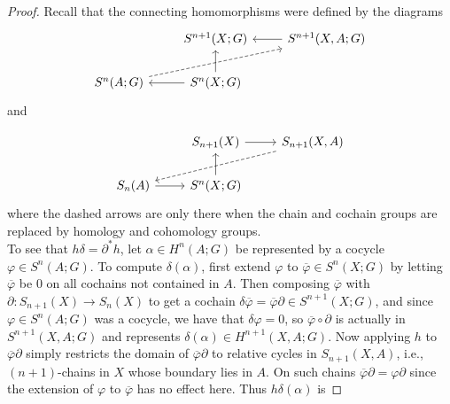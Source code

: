 \documentclass[reqno]{amsart}
\theoremstyle{definition}
\theoremstyle{remark}
\begin{document}
     \begin{proof}
         Recall that the connecting homomorphisms
         were defined by the diagrams
         \begin{equation*}
         \begin{tikzcd}
             & S^{n+1}(X;G) & S^{n+1}(X,A;G) \ar[l] \\
             S^{n}(A;G) \ar[rru, dashed] & S^{n}(X;G) \ar[u] 
             \ar[l]
         \end{tikzcd}
         \end{equation*}
         and

         \begin{equation*}
         \begin{tikzcd}
             & S_{n+1}(X) \ar[r] & S_{n+1}(X,A) \ar[dll, dashed]\\
             S_n(A) \ar[r] & S^{n}(X;G) \ar[u] &
         \end{tikzcd}
         \end{equation*}
         where the dashed arrows are
         only there when the chain and cochain groups
         are replaced by homology and cohomology groups.\\
         To see that $h \delta = \partial^{*} h$,
         let $\alpha \in H^{n}(A;G)$ be represented
         by a cocycle $\varphi  \in S^{n}(A;G)$.
         To compute $\delta (\alpha)$, first
         extend $\varphi $ to
         $\overline{\varphi }\in 
         S^{n}(X;G)$ by letting $\overline{\varphi }$ 
         be $0$ on all cochains not contained in
         $A$. Then
         composing $\overline{\varphi }$ with
         $\partial \colon S_{n+1}(X) \to S_n(X)$
         to get a cochain
         $\delta \overline{\varphi }
         = \overline{\varphi } \partial \in 
         S^{n+1}(X;G)$, and since
         $\varphi \in S^{n}(A;G)$ was a cocycle, we have
         that $\delta \varphi  = 0$, so
         $\overline{\varphi } \circ \partial$ is actually
         in $S^{n+1}(X,A;G)$ and represents
         $\delta \left( \alpha \right) \in 
         H^{n+1}(X,A;G)$.
         Now applying $h$ to $\overline{\varphi }
         \partial$ simply restricts the domain
         of $\overline{\varphi }\partial $ to relative
         cycles in $S_{n+1}(X,A)$, i.e., 
         $(n+1)$-chains in $X$ whose boundary lies in 
         $A$. On such chains
         $\overline{\varphi } \partial = 
         \varphi \partial$ since the extension of $\varphi $ 
         to $\overline{\varphi }$ has no effect here.
         Thus
         $h \delta \left( \alpha \right) $ is

\end{proof}
\end{document}

